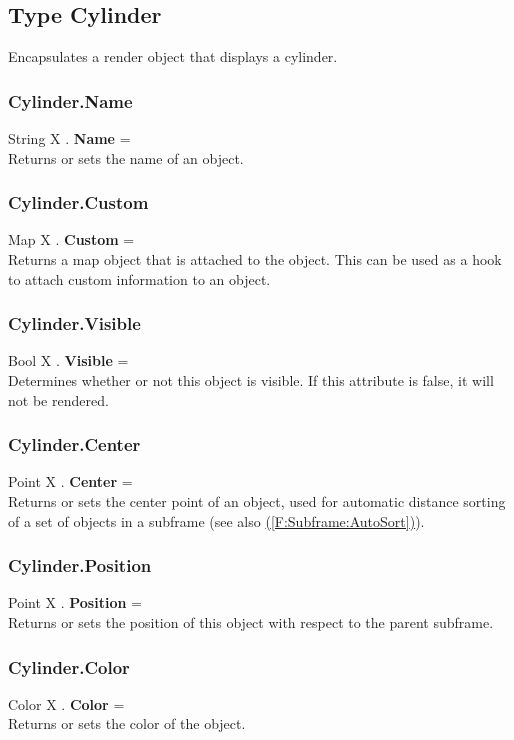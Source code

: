 \documentclass[10pt]{book}
\newcommand{\linkitem}[1]{\hyperref[#1]{\nameref{#1} (\ref{#1})}}
\begin{document}
\subsection{Type Cylinder \label{T:Cylinder}}
Encapsulates a render object that displays a cylinder.

\subsubsection{Cylinder.Name \label{F:Cylinder:Name}}
String X . \textbf{Name} = \\
Returns or sets the name of an object.

\subsubsection{Cylinder.Custom \label{F:Cylinder:Custom}}
Map X . \textbf{Custom} = \\
Returns a map object that is attached to the object. This can be used as a hook to attach custom information to an object.


\subsubsection{Cylinder.Visible \label{F:Cylinder:Visible}}
Bool X . \textbf{Visible} = \\
Determines whether or not this object is visible. If this attribute is false, it will not be rendered.

\subsubsection{Cylinder.Center \label{F:Cylinder:Center}}
Point X . \textbf{Center} = \\
Returns or sets the center point of an object, used for automatic distance sorting of a set of objects in a subframe (see also \linkitem{F:Subframe:AutoSort}).

\subsubsection{Cylinder.Position \label{F:Cylinder:Position}}
Point X . \textbf{Position} = \\
Returns or sets the position of this object with respect to the parent subframe.

\subsubsection{Cylinder.Color \label{F:Cylinder:Color}}
Color X . \textbf{Color} = \\
Returns or sets the color of the object.
\end{document}
